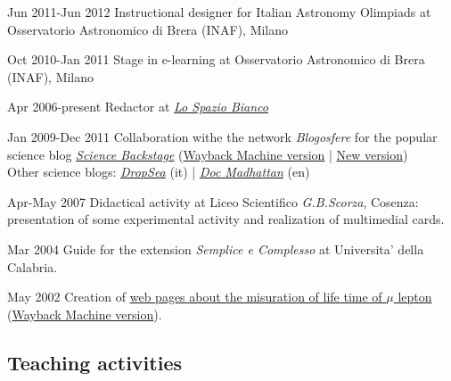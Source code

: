 \begin{CV}
	\item[Jun 2011-Jun 2012] Instructional designer for Italian Astronomy Olimpiads at Osservatorio Astronomico di Brera (INAF), Milano
	
	\item[Oct 2010-Jan 2011] Stage in e-learning at Osservatorio Astronomico di Brera (INAF), Milano
	
	\item[Apr 2006-present] Redactor at \href{http://www.lospaziobianco.it/}{\em Lo Spazio Bianco}
	
	\item[Jan 2009-Dec 2011] Collaboration withe the network {\em Blogosfere} for the popular science blog \href{http://sciencebackstage.blogosfere.it/}{\em Science Backstage} (\href{https://web.archive.org/web/20111211024053/http://sciencebackstage.blogosfere.it/}{Wayback Machine version} | \href{http://sciencebackstage.blogspot.it/}{New version})\\
	Other science blogs: \href{http://dropseaofulaula.blogspot.com/}{\em DropSea} (it) | \href{http://docmadhattan.fieldofscience.com/}{\em Doc Madhattan} (en)
	
	\item[Apr-May 2007] Didactical activity at Liceo Scientifico {\em G.B.Scorza}, Cosenza: presentation of some experimental activity and realization of multimedial cards.
	
	\item[Mar 2004] Guide for the extension {\em Semplice e Complesso} at Universita' della Calabria.
	
	\item[May 2002] Creation of \href{http://www.fis.unical.it/gruppi/alteenergie/}{web pages  about the misuration of life time of $\mu$ lepton} (\href{http://web.archive.org/web/20070207064033/http://www.fis.unical.it/gruppi/alteenergie/}{Wayback Machine version}).
	
\end{CV}

\subsection*{Teaching activities}

